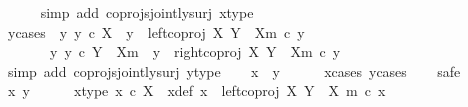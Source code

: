 \begin{isabellebody}
\ \ \ \ \isamarkupfalse%
\ {\isacharparenleft}{\kern0pt}simp\ add{\isacharcolon}{\kern0pt}\ coprojs{\isacharunderscore}{\kern0pt}jointly{\isacharunderscore}{\kern0pt}surj\ x{\isacharunderscore}{\kern0pt}type{\isacharparenright}{\kern0pt}\isanewline
\isanewline
\ \ \isamarkupfalse%
\ y{\isacharunderscore}{\kern0pt}cases{\isacharcolon}{\kern0pt}\ {\isachardoublequoteopen}{\isacharparenleft}{\kern0pt}{\isasymexists}\ y{\isacharprime}{\kern0pt}{\isachardot}{\kern0pt}\ y{\isacharprime}{\kern0pt}\ {\isasymin}\isactrlsub c\ X\ {\isasymand}\ y\ {\isacharequal}{\kern0pt}\ left{\isacharunderscore}{\kern0pt}coproj\ X\ {\isacharparenleft}{\kern0pt}Y\ {\isasymsetminus}\ {\isacharparenleft}{\kern0pt}X{\isacharcomma}{\kern0pt}m{\isacharparenright}{\kern0pt}{\isacharparenright}{\kern0pt}\ {\isasymcirc}\isactrlsub c\ y{\isacharprime}{\kern0pt}{\isacharparenright}{\kern0pt}\isanewline
\ \ \ \ {\isasymor}\ \ {\isacharparenleft}{\kern0pt}{\isasymexists}\ y{\isacharprime}{\kern0pt}{\isachardot}{\kern0pt}\ y{\isacharprime}{\kern0pt}\ {\isasymin}\isactrlsub c\ Y\ {\isasymsetminus}\ {\isacharparenleft}{\kern0pt}X{\isacharcomma}{\kern0pt}m{\isacharparenright}{\kern0pt}\ {\isasymand}\ y\ {\isacharequal}{\kern0pt}\ right{\isacharunderscore}{\kern0pt}coproj\ X\ {\isacharparenleft}{\kern0pt}Y\ {\isasymsetminus}\ {\isacharparenleft}{\kern0pt}X{\isacharcomma}{\kern0pt}m{\isacharparenright}{\kern0pt}{\isacharparenright}{\kern0pt}\ {\isasymcirc}\isactrlsub c\ y{\isacharprime}{\kern0pt}{\isacharparenright}{\kern0pt}{\isachardoublequoteclose}\isanewline
\ \ \ \ \isamarkupfalse%
\ {\isacharparenleft}{\kern0pt}simp\ add{\isacharcolon}{\kern0pt}\ coprojs{\isacharunderscore}{\kern0pt}jointly{\isacharunderscore}{\kern0pt}surj\ y{\isacharunderscore}{\kern0pt}type{\isacharparenright}{\kern0pt}\isanewline
\isanewline
\ \ \isamarkupfalse%
\ {\isachardoublequoteopen}x\ {\isacharequal}{\kern0pt}\ y{\isachardoublequoteclose}\isanewline
\ \ \ \ \isamarkupfalse%
\ x{\isacharunderscore}{\kern0pt}cases\ y{\isacharunderscore}{\kern0pt}cases\isanewline
\ \ \isamarkupfalse%
\ safe\isanewline
\ \ \ \ \isamarkupfalse%
\ x{\isacharprime}{\kern0pt}\ y{\isacharprime}{\kern0pt}\isanewline
\ \ \ \ \isamarkupfalse%
\ x{\isacharprime}{\kern0pt}{\isacharunderscore}{\kern0pt}type{\isacharcolon}{\kern0pt}\ {\isachardoublequoteopen}x{\isacharprime}{\kern0pt}\ {\isasymin}\isactrlsub c\ X{\isachardoublequoteclose}\ \ x{\isacharunderscore}{\kern0pt}def{\isacharcolon}{\kern0pt}\ {\isachardoublequoteopen}x\ {\isacharequal}{\kern0pt}\ left{\isacharunderscore}{\kern0pt}coproj\ X\ {\isacharparenleft}{\kern0pt}Y\ {\isasymsetminus}\ {\isacharparenleft}{\kern0pt}X{\isacharcomma}{\kern0pt}\ m{\isacharparenright}{\kern0pt}{\isacharparenright}{\kern0pt}\ {\isasymcirc}\isactrlsub c\ x{\isacharprime}{\kern0pt}{\isachardoublequoteclose}\isanewline

\end{isabellebody}
